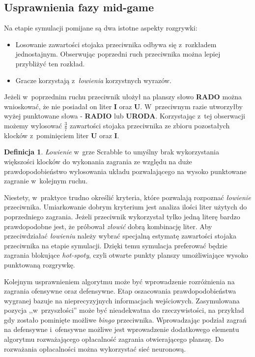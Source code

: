 \documentclass[a4paper,twocolumn,11pt]{article}
\theoremstyle{definition}
\newtheorem{definition}{Definicja}
\begin{document}
\subsection{Usprawnienia fazy mid-game}

Na etapie symulacji pomijane są dwa istotne aspekty rozgrywki:

\begin{itemize}
	\item Losowanie zawartości stojaka przeciwnika odbywa się z~rozkładem jednostajnym. Obserwując poprzedni ruch przeciwnika można lepiej przybliżyć ten rozkład.
	\item Gracze korzystają z~\emph{łowienia} korzystnych wyrazów.
\end{itemize}

Jeżeli w~poprzednim ruchu przeciwnik ułożył na planszy słowo \textbf{RADO} można wnioskować, że nie posiadał on liter \textbf{I} oraz \textbf{U}. W~przeciwnym razie utworzyłby wyżej punktowane słowa - \textbf{RADIO} lub \textbf{URODA}. Korzystając z~tej obserwacji możemy wylosować $\frac{3}{7}$ zawartości stojaka przeciwnika ze zbioru pozostałych klocków z~pominięciem liter \textbf{U} oraz \textbf{I}. 

\begin{definition}
	\emph{Łowienie} w~grze Scrabble to umyślny brak wykorzystania większości klocków do wykonania zagrania ze względu na duże prawdopodobieństwo wylosowania układu pozwalającego na wysoko punktowane zagranie w~kolejnym ruchu.
\end{definition}

Niestety, w~praktyce trudno określić kryteria, które pozwalają rozpoznać \emph{łowienie} przeciwnika. Umiarkowanie dobrym kryterium jest analiza ilości liter użytych do poprzedniego zagrania. Jeżeli przeciwnik wykorzystał tylko jedną literę bardzo prawdopodobne jest, że próbował \emph{złowić} dobrą kombinację liter. Aby przeciwdziałać \emph{łowieniu} należy wybrać specjalną estymatę zawartości stojaka przeciwnika na etapie symulacji. Dzięki temu symulacja preferować będzie zagrania blokujące \emph{hot-spoty}, czyli otwarte punkty planszy umożliwiające wysoko punktowaną rozgrywkę.

Kolejnym usprawnieniem algorytmu może być wprowadzenie rozróżnienia na zagrania ofensywne oraz defensywne. Etap oszacowania prawdopodobieństwa wygranej bazuje na nieprecyzyjnych informacjach wejściowych. Zasymulowana pozycja ,,w~przyszłości'' może być nieadekwatna do rzeczywistości, na przykład gdy zostało pominięte możliwe \emph{bingo} przeciwnika. Wprowadzając podział zagrań na defensywne i~ofensywne możliwe jest wprowadzenie dodatkowego elementu algorytmu rozważającego opłacalność zagrania otwierającego planszę. Do rozważania opłacalności można wykorzystać sieć neuronową.
\end{document}
